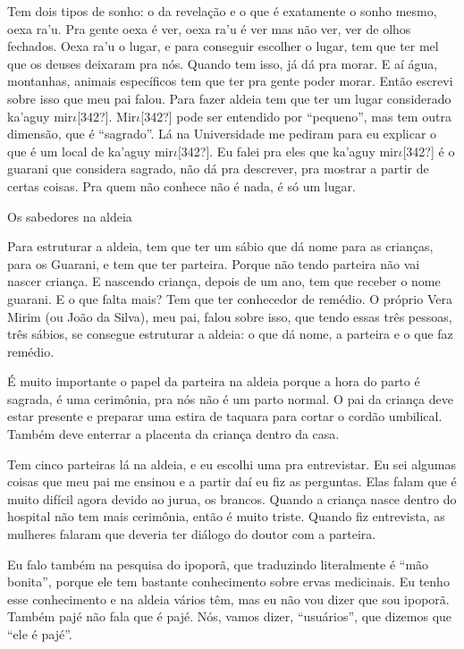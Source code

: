 \documentclass{article}
\begin{document}
Tem dois tipos de sonho: o da revela\c{c}\~ao e o que \'e exatamente o
sonho mesmo, oexa ra{\textquoteright}u. Pra gente oexa \'e ver, oexa
ra{\textquoteright}u \'e ver mas n\~ao ver, ver de olhos fechados. Oexa
ra{\textquoteright}u o lugar, e para conseguir escolher o lugar, tem
que ter mel que os deuses deixaram pra n\'os. Quando tem isso, j\'a
d\'a pra morar. E a\'i \'agua, montanhas, animais espec\'ificos tem que
ter pra gente poder morar. Ent\~ao escrevi sobre isso que meu pai
falou. Para fazer aldeia tem que ter um lugar considerado
ka{\textquoteright}aguy mir$\iota $[342?]. Mir$\iota $[342?] pode ser
entendido por {\textquotedblleft}pequeno{\textquotedblright}, mas tem
outra dimens\~ao, que \'e
{\textquotedblleft}sagrado{\textquotedblright}. L\'a na Universidade me
pediram para eu explicar o que \'e um local de ka{\textquoteright}aguy
mir$\iota $[342?]. Eu falei pra eles que ka{\textquoteright}aguy
mir$\iota $[342?] \'e o guarani que considera sagrado, n\~ao d\'a pra
descrever, pra mostrar a partir de certas coisas. Pra quem n\~ao
conhece n\~ao \'e nada, \'e s\'o um lugar.

Os sabedores na aldeia

Para estruturar a aldeia, tem que ter um s\'abio que d\'a nome para as
crian\c{c}as, para os Guarani, e tem que ter parteira. Porque n\~ao
tendo parteira n\~ao vai nascer crian\c{c}a. E nascendo crian\c{c}a,
depois de um ano, tem que receber o nome guarani. E o que falta mais?
Tem que ter conhecedor de rem\'edio. O pr\'oprio Vera Mirim (ou Jo\~ao
da Silva), meu pai, falou sobre isso, que tendo essas tr\^es pessoas,
tr\^es s\'abios, se consegue estruturar a aldeia: o que d\'a nome, a
parteira e o que faz rem\'edio.

\'E muito importante o papel da parteira na aldeia porque a hora do
parto \'e sagrada, \'e uma cerim\^onia, pra n\'os n\~ao \'e um parto
normal. O pai da crian\c{c}a deve estar presente e preparar uma estira
de taquara para cortar o cord\~ao umbilical. Tamb\'em deve enterrar a
placenta da crian\c{c}a dentro da casa.

Tem cinco parteiras l\'a na aldeia, e eu escolhi uma pra entrevistar. Eu
sei algumas coisas que meu pai me ensinou e a partir da\'i eu fiz as
perguntas. Elas falam que \'e muito dif\'icil agora devido ao jurua, os
brancos. Quando a crian\c{c}a nasce dentro do hospital n\~ao tem mais
cerim\^onia, ent\~ao \'e muito triste. Quando fiz entrevista, as
mulheres falaram que deveria ter di\'alogo do doutor com a parteira. 

Eu falo tamb\'em na pesquisa do ipopor\~a, que traduzindo literalmente
\'e {\textquotedblleft}m\~ao bonita{\textquotedblright}, porque ele tem
bastante conhecimento sobre ervas medicinais. Eu tenho esse
conhecimento e na aldeia v\'arios t\^em, mas eu n\~ao vou dizer que sou
ipopor\~a. Tamb\'em paj\'e n\~ao fala que \'e paj\'e. N\'os, vamos
dizer, {\textquotedblleft}usu\'arios{\textquotedblright}, que dizemos
que {\textquotedblleft}ele \'e paj\'e{\textquotedblright}.
\end{document}
